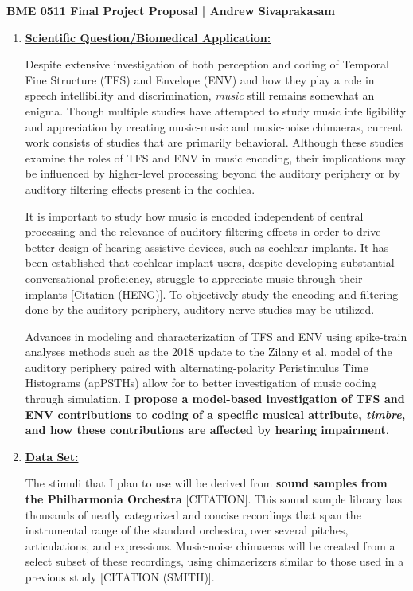 \documentclass[9pt]{article}
\begin{document}
\begin{center}
{\Large \textbf{BME 0511 Final Project Proposal | Andrew Sivaprakasam}}
\end{center}
\vspace{.25em}
\begin{enumerate}

\item \textbf{\underline{Scientific Question/Biomedical Application:}}

Despite extensive investigation of both perception and coding of Temporal Fine Structure (TFS) and Envelope (ENV) and how they play a role in speech intellibility and discrimination, \textit{music} still remains somewhat an enigma. Though multiple studies have attempted to study music intelligibility and appreciation by creating music-music and music-noise chimaeras, current work consists of studies that are primarily behavioral. Although these studies examine the roles of TFS and ENV in music encoding, their implications may be influenced by higher-level processing beyond the auditory periphery or by auditory filtering effects present in the cochlea. 

It is important to study how music is encoded independent of central processing and the relevance of auditory filtering effects in order to drive better design of hearing-assistive devices, such as cochlear implants. It has been established that cochlear implant users, despite developing substantial conversational proficiency, struggle to appreciate music through their implants [Citation (HENG)]. To objectively study the encoding and filtering done by the auditory periphery, auditory nerve studies may be utilized.

Advances in modeling and characterization of TFS and ENV using spike-train analyses methods such as the 2018 update to the Zilany et al. model of the auditory periphery paired with alternating-polarity Peristimulus Time Histograms (apPSTHs) allow for to better investigation of music coding through simulation. \textbf{I propose a model-based investigation of TFS and ENV contributions to coding of a specific musical attribute, \textit{timbre}, and how these contributions are affected by hearing impairment}.   

\item \textbf{\underline{Data Set:}}

The stimuli that I plan to use will be derived from \textbf{sound samples from the Philharmonia Orchestra} [CITATION]. This sound sample library has thousands of neatly categorized and concise recordings that span the instrumental range of the standard orchestra, over several pitches, articulations, and expressions. Music-noise chimaeras will be created from a select subset of these recordings, using chimaerizers similar to those used in a previous study [CITATION (SMITH)]. 


\end{enumerate}
\end{document}
